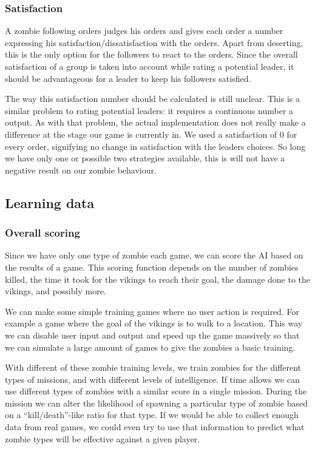 \subsubsection{Satisfaction}
\label{sec:satisfaction}
A zombie following orders judges his orders and gives each order a number expressing his satisfaction/dissatisfaction with the orders. Apart from deserting, this is the only option for the followers to react to the orders. Since the overall satisfaction of a group is taken into account while rating a potential leader, it should be advantageous for a leader to keep his followers satisfied.

The way this satisfaction number should be calculated is still unclear. This is a similar problem to rating potential leaders: it requires a continuous number a output. As with that problem, the actual implementation does not really make a difference at the stage our game is currently in. We used a satisfaction of $0$ for every order, signifying no change in satisfaction with the leaders choices. So long we have only one or possible two strategies available, this is will not have a negative result on our zombie behaviour.

\subsection{Learning data}
\label{sec:learning_data}
\subsubsection{Overall scoring}
Since we have only one type of zombie each game, we can score the AI based on the results of a game. This scoring function depends on the number of zombies killed, the time it took for the vikings to reach their goal, the damage done to the vikings, and possibly more.

We can make some simple training games where no user action is required. For example a game where the goal of the vikings is to walk to a location. This way we can disable user input and output and speed up the game massively so that we can simulate a large amount of games to give the zombies a basic training.

With different of these zombie training levels, we train zombies for the different types of missions, and with different levels of intelligence. If time allows we can use different types of zombies with a similar score in a single mission. During the mission we can alter the likelihood of spawning a particular type of zombie based on a ``kill/death''-like ratio for that type. If we would be able to collect enough data from real games, we could even try to use that information to predict what zombie types will be effective against a given player.

